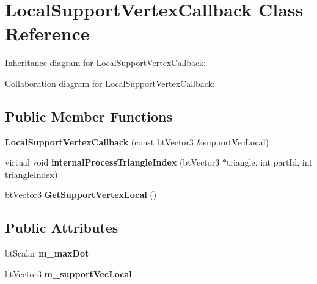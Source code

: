 \hypertarget{class_local_support_vertex_callback}{\section{Local\+Support\+Vertex\+Callback Class Reference}
\label{class_local_support_vertex_callback}
}


Inheritance diagram for Local\+Support\+Vertex\+Callback\+:


Collaboration diagram for Local\+Support\+Vertex\+Callback\+:
\subsection*{Public Member Functions}
\begin{DoxyCompactItemize}
\item 
\hypertarget{class_local_support_vertex_callback_ada150b522495aaeb7092a63995e25edd}{{\bfseries Local\+Support\+Vertex\+Callback} (const bt\+Vector3 \&support\+Vec\+Local)}\label{class_local_support_vertex_callback_ada150b522495aaeb7092a63995e25edd}

\item 
\hypertarget{class_local_support_vertex_callback_afa65b300345ae9c76b79dd552832eb10}{virtual void {\bfseries internal\+Process\+Triangle\+Index} (bt\+Vector3 $\ast$triangle, int part\+Id, int triangle\+Index)}\label{class_local_support_vertex_callback_afa65b300345ae9c76b79dd552832eb10}

\item 
\hypertarget{class_local_support_vertex_callback_a3da8f1b5c1b2443a2f27cd6593d2bfc1}{bt\+Vector3 {\bfseries Get\+Support\+Vertex\+Local} ()}\label{class_local_support_vertex_callback_a3da8f1b5c1b2443a2f27cd6593d2bfc1}

\end{DoxyCompactItemize}
\subsection*{Public Attributes}
\begin{DoxyCompactItemize}
\item 
\hypertarget{class_local_support_vertex_callback_a3483eea79bc6d99098df59836617ee6f}{bt\+Scalar {\bfseries m\+\_\+max\+Dot}}\label{class_local_support_vertex_callback_a3483eea79bc6d99098df59836617ee6f}

\item 
\hypertarget{class_local_support_vertex_callback_a9a18c48f1c83568d7d69bf68adc9d836}{bt\+Vector3 {\bfseries m\+\_\+support\+Vec\+Local}}\label{class_local_support_vertex_callback_a9a18c48f1c83568d7d69bf68adc9d836}

\end{DoxyCompactItemize}


